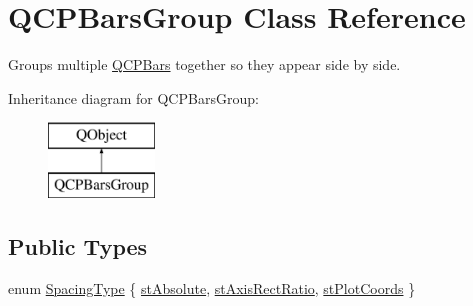 \hypertarget{class_q_c_p_bars_group}{}\section{Q\+C\+P\+Bars\+Group Class Reference}
\label{class_q_c_p_bars_group}


Groups multiple \mbox{\hyperlink{class_q_c_p_bars}{Q\+C\+P\+Bars}} together so they appear side by side.  


Inheritance diagram for Q\+C\+P\+Bars\+Group\+:\begin{figure}[H]
\begin{center}
\leavevmode
\includegraphics[height=2.000000cm]{class_q_c_p_bars_group}
\end{center}
\end{figure}
\subsection*{Public Types}
\begin{DoxyCompactItemize}
\item 
enum \mbox{\hyperlink{class_q_c_p_bars_group_a4c0521120a97e60bbca37677a37075b6}{Spacing\+Type}} \{ \mbox{\hyperlink{class_q_c_p_bars_group_a4c0521120a97e60bbca37677a37075b6ab53fa3efaf14867dd0f14d41d64e42ac}{st\+Absolute}}, 
\mbox{\hyperlink{class_q_c_p_bars_group_a4c0521120a97e60bbca37677a37075b6ae94b05c27bc985dcdd8b1e1b7f163d26}{st\+Axis\+Rect\+Ratio}}, 
\mbox{\hyperlink{class_q_c_p_bars_group_a4c0521120a97e60bbca37677a37075b6ad369cee6287e0a86e8c2b643a3168c54}{st\+Plot\+Coords}}
 \}
\end{DoxyCompactItemize}
